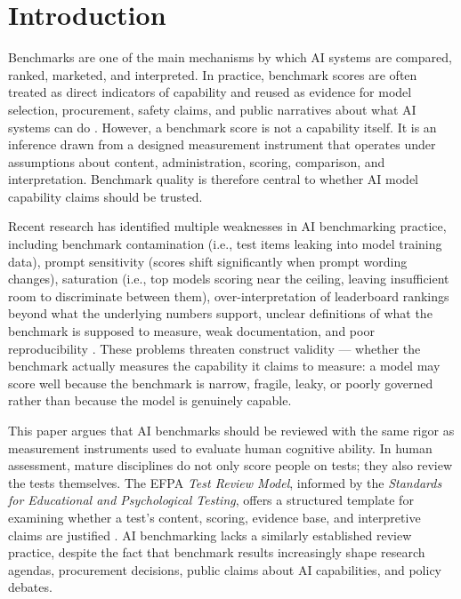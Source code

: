 \documentclass[conference]{IEEEtran}
\begin{document}
\section{Introduction}

    Benchmarks are one of the main mechanisms by which AI systems are compared, ranked, marketed, and interpreted. In practice, benchmark scores are often treated as direct indicators of capability and reused as evidence for model selection, procurement, safety claims, and public narratives about what AI systems can do \cite{singh_leaderboard_illusion,alonso_church_sigir}. However, a benchmark score is not a capability itself. It is an inference drawn from a designed measurement instrument that operates under assumptions about content, administration, scoring, comparison, and interpretation. Benchmark quality is therefore central to whether AI model capability claims should be trusted.
    
    Recent research has identified multiple weaknesses in AI benchmarking practice, including benchmark contamination (i.e., test items leaking into model training data), prompt sensitivity (scores shift significantly when prompt wording changes), saturation (i.e., top models scoring near the ceiling, leaving insufficient room to discriminate between them), over-interpretation of leaderboard rankings beyond what the underlying numbers support, unclear definitions of what the benchmark is supposed to measure, weak documentation, and poor reproducibility \cite{jo_wilson_what_does_your_benchmark_measure}. These problems threaten construct validity --- whether the benchmark actually measures the capability it claims to measure: a model may score well because the benchmark is narrow, fragile, leaky, or poorly governed rather than because the model is genuinely capable.
    
    This paper argues that AI benchmarks should be reviewed with the same rigor as measurement instruments used to evaluate human cognitive ability. In human assessment, mature disciplines do not only score people on tests; they also review the tests themselves. The EFPA \textit{Test Review Model}, informed by the \textit{Standards for Educational and Psychological Testing}, offers a structured template for examining whether a test's content, scoring, evidence base, and interpretive claims are justified \cite{aera_apa_ncme_standards_2014,efpa_test_review_model_2025}. AI benchmarking lacks a similarly established review practice, despite the fact that benchmark results increasingly shape research agendas, procurement decisions, public claims about AI capabilities, and policy debates.
    
\end{document}
